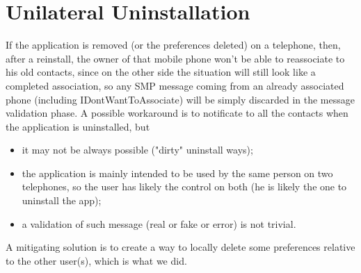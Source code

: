 \section{Unilateral Uninstallation}
If the application is removed (or the preferences deleted) on a telephone, then, after a reinstall, the owner of that mobile phone won't be able to reassociate to his old contacts, since on the other side the situation will still look like a completed association, so any SMP message coming from an already associated phone (including IDontWantToAssociate) will be simply discarded in the message validation phase. A possible workaround is to notificate to all the contacts when the application is uninstalled, but\\
\begin{itemize}
\item it may not be always possible ("dirty" uninstall ways);
\item the application is mainly intended to be used by the same person on two telephones, so the user has likely the control on both (he is likely the one to uninstall the app);
\item a validation of such message (real or fake or error) is not trivial.
\end{itemize}
\vspace{0.7cm}
A mitigating solution is to create a way to locally delete some preferences relative to the other user(s), which is what we did.